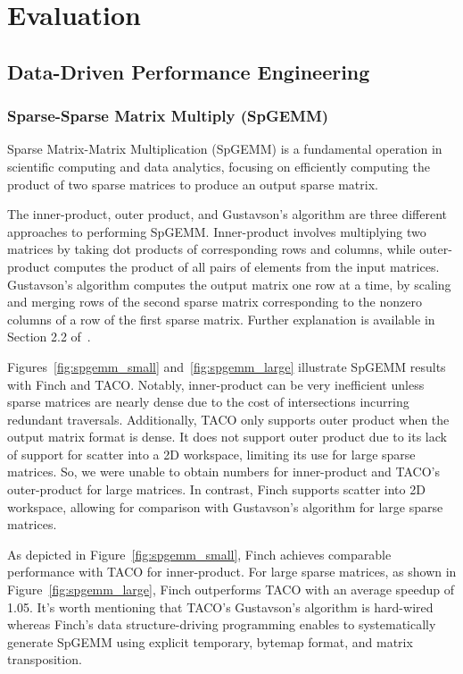 
\section{Evaluation}

\subsection{Data-Driven Performance Engineering}
\subsubsection{Sparse-Sparse Matrix Multiply (SpGEMM)}

Sparse Matrix-Matrix Multiplication (SpGEMM) is a fundamental operation in scientific computing and data analytics, focusing on efficiently computing the product of two sparse matrices to produce an output sparse matrix.

The inner-product, outer product, and Gustavson's algorithm are three different approaches to performing SpGEMM. Inner-product involves multiplying two matrices by taking dot products of corresponding rows and columns, while outer-product computes the product of all pairs of elements from the input matrices.
Gustavson's algorithm computes the output matrix one row at a time, by scaling and merging rows of the second sparse matrix corresponding to the nonzero columns of a row of the first sparse matrix.
Further explanation is available in Section 2.2 of~\cite{zhang2021gamma}.

Figures~\ref{fig:spgemm_small} and~\ref{fig:spgemm_large} illustrate SpGEMM results with Finch and TACO. Notably, inner-product can be very inefficient unless sparse matrices are nearly dense due to the cost of intersections incurring redundant traversals. Additionally, TACO only supports outer product when the output matrix format is dense. It does not support outer product due to its lack of support for scatter into a 2D workspace, limiting its use for large sparse matrices. So, we were unable to obtain numbers for inner-product and TACO's outer-product for large matrices. In contrast, Finch supports scatter into 2D workspace, allowing for comparison with Gustavson's algorithm for large sparse matrices.

As depicted in Figure~\ref{fig:spgemm_small}, Finch achieves comparable performance with TACO for inner-product. For large sparse matrices, as shown in Figure~\ref{fig:spgemm_large}, Finch outperforms TACO with an average speedup of 1.05. It's worth mentioning that TACO's Gustavson's algorithm is hard-wired whereas Finch's data structure-driving programming enables to systematically generate SpGEMM using explicit temporary, bytemap format, and matrix transposition.

